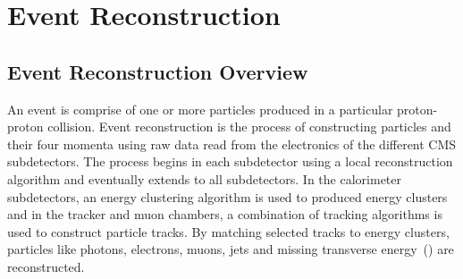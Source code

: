 \chapter{Event Reconstruction}
\section{Event Reconstruction Overview}
An event is comprise of one or more particles produced in a particular proton-proton collision.
Event reconstruction is the process of constructing particles and their four momenta using raw data read from the electronics of the different CMS subdetectors. The process begins in each subdetector using a local reconstruction algorithm and eventually extends to all subdetectors. In the calorimeter subdetectors, an energy clustering algorithm is used to produced energy clusters and in the tracker and muon chambers, a combination of tracking algorithms is used to construct particle tracks. By matching selected tracks to energy clusters, particles like photons, electrons, muons, jets and missing transverse energy~(\MET) are reconstructed.
